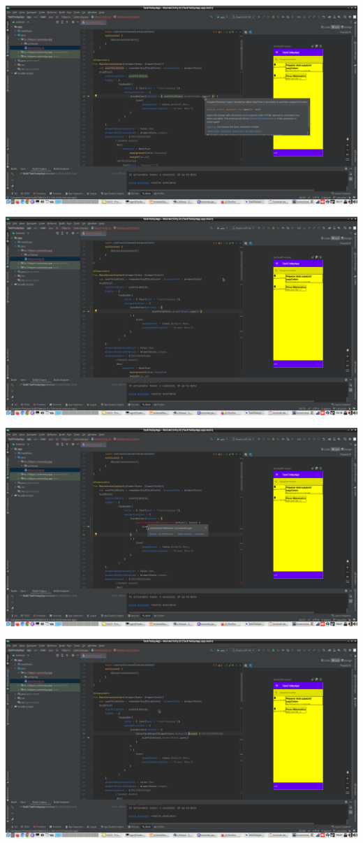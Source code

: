 \documentclass[11pt]{article}
\begin{document}
\begin{center}
\includegraphics[width=.9\linewidth]{./Captura de tela de 2023-03-29 18-17-38.png}
\end{center}
\begin{center}
\includegraphics[width=.9\linewidth]{./Captura de tela de 2023-03-29 18-18-03.png}
\end{center}
\begin{center}
\includegraphics[width=.9\linewidth]{./Captura de tela de 2023-03-29 18-21-14.png}
\end{center}
\begin{center}
\includegraphics[width=.9\linewidth]{./Captura de tela de 2023-03-29 18-21-40.png}
\end{center}
\end{document}
